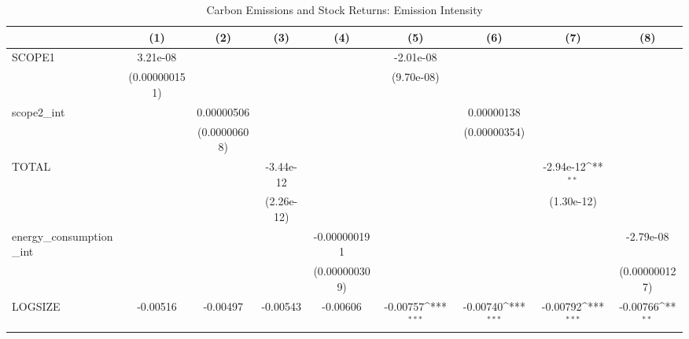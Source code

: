 \begin{table}[htbp]\centering
\def\sym#1{\ifmmode^{#1}\else\(^{#1}\)\fi}
\caption{Carbon Emissions and Stock Returns: Emission Intensity}
\begin{tabular}{l*{8}{c}}
\hline\hline
                    &\multicolumn{1}{c}{(1)}         &\multicolumn{1}{c}{(2)}         &\multicolumn{1}{c}{(3)}         &\multicolumn{1}{c}{(4)}         &\multicolumn{1}{c}{(5)}         &\multicolumn{1}{c}{(6)}         &\multicolumn{1}{c}{(7)}         &\multicolumn{1}{c}{(8)}         \\
\hline
SCOPE1              &    3.21e-08         &                     &                     &                     &   -2.01e-08         &                     &                     &                     \\
                    &(0.000000151)         &                     &                     &                     &  (9.70e-08)         &                     &                     &                     \\
scope2\_int          &                     &  0.00000506         &                     &                     &                     &  0.00000138         &                     &                     \\
                    &                     &(0.00000608)         &                     &                     &                     &(0.00000354)         &                     &                     \\
TOTAL               &                     &                     &   -3.44e-12         &                     &                     &                     &   -2.94e-12\sym{**} &                     \\
                    &                     &                     &  (2.26e-12)         &                     &                     &                     &  (1.30e-12)         &                     \\
energy\_consumption\_int&                     &                     &                     &-0.000000191         &                     &                     &                     &   -2.79e-08         \\
                    &                     &                     &                     &(0.000000309)         &                     &                     &                     &(0.000000127)         \\
LOGSIZE             &    -0.00516         &    -0.00497         &    -0.00543         &    -0.00606         &    -0.00757\sym{***}&    -0.00740\sym{***}&    -0.00792\sym{***}&    -0.00766\sym{**} \\

\end{tabular}
\end{table}
